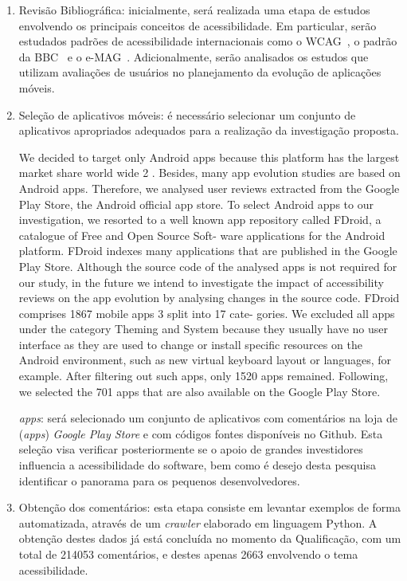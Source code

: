 \begin{enumerate}
	
	\item Revisão Bibliográfica: inicialmente, será realizada uma etapa de estudos envolvendo os principais conceitos de acessibilidade. Em particular, serão estudados padrões de acessibilidade internacionais como o WCAG~\cite{wcag}, o padrão da BBC~\cite{bbc} e o e-MAG~\cite{emag}. Adicionalmente, serão analisados os estudos que utilizam avaliações de usuários no planejamento da evolução de aplicações móveis.

	
	\item Seleção de aplicativos móveis: é necessário selecionar um conjunto de aplicativos apropriados adequados para a realização da investigação proposta. 
	
	
	We decided to target only Android apps because this platform
has the largest market share world wide 2 . Besides, many app
evolution studies are based on Android apps. Therefore, we
analysed user reviews extracted from the Google Play Store,
the Android official app store. To select Android apps to our
investigation, we resorted to a well known app repository
called FDroid, a catalogue of Free and Open Source Soft-
ware applications for the Android platform. FDroid indexes
many applications that are published in the Google Play
Store. Although the source code of the analysed apps is not
required for our study, in the future we intend to investigate
the impact of accessibility reviews on the app evolution by
analysing changes in the source code.
FDroid comprises 1867 mobile apps 3 split into 17 cate-
gories. We excluded all apps under the category Theming
and System because they usually have no user interface as
they are used to change or install specific resources on the
Android environment, such as new virtual keyboard layout
or languages, for example. After filtering out such apps, only
1520 apps remained. Following, we selected the 701 apps that
are also available on the Google Play Store.
	
	
	
	\textit{apps}: será selecionado um conjunto de aplicativos com comentários na loja de (\textit{apps}) \textit{Google Play Store} e com códigos fontes disponíveis no Github. Esta seleção visa verificar posteriormente se o apoio de grandes investidores influencia a acessibilidade do software, bem como é desejo desta pesquisa identificar o panorama para os pequenos desenvolvedores.
	
	\item Obtenção dos comentários: esta etapa consiste em levantar exemplos de forma automatizada, através de um \textit{crawler} elaborado em linguagem Python. A obtenção destes dados já está concluída no momento da Qualificação, com um total de 214053 comentários, e destes apenas 2663 envolvendo o tema acessibilidade.
	

\end{enumerate}

